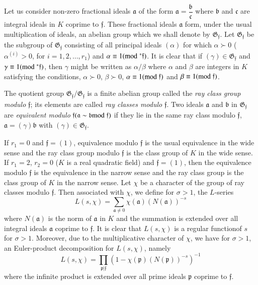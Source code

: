 Let us consider non-zero fractional ideals $\mathfrak{a}$ of the form
$\mathfrak{a}=\dfrac{\mathfrak{b}}{\mathfrak{c}}$ where $\mathfrak{b}$
and $\mathfrak{c}$ are integral ideals in $K$ coprime to
$\mathfrak{f}$. These fractional ideals $\mathfrak{a}$ form, under the
usual multiplication of ideals, an abelian group which we shall denote
by $\mathfrak{G}_{\mathfrak{f}}$. Let $\mathfrak{G}_{\mathfrak{f}}$ be
the subgroup of $\mathfrak{G}_{\mathfrak{f}}$ consisting of all
principal ideals $(\alpha)$ for which $\alpha \succ 0$ (\ie
$\alpha^{(i)}>0$, for $i=1,2,\ldots,r_{1}$) and $\alpha\equiv
1(\rm{mod} \;^{\ast}\mathfrak{f})$. It is clear that if
$(\gamma)\in\mathfrak{G}_{\mathfrak{f}}$ and $\gamma\equiv
1(\rm{mod} \;^{\ast}\mathfrak{f})$, then $\gamma$ might be written as
$\alpha/\beta$ where $\alpha$ and $\beta$ are integers in $K$
satisfying the conditions, $\alpha \succ 0$, $\beta \succ 0$, $\alpha\equiv
1(\rm{mod} \;\mathfrak{f})$ and $\beta\equiv 1(\rm{mod} \;\mathfrak{f})$. 

The quotient group
$\mathfrak{G}_{\mathfrak{f}}/\mathfrak{G}_{\mathfrak{f}}$ is a finite
abelian group called the {\em ray class group modulo} $\mathfrak{f}$;
its elements are called {\em ray classes modulo} $\mathfrak{f}$. Two
ideals $\mathfrak{a}$ and $\mathfrak{b}$ in
$\mathfrak{G}_{\mathfrak{f}}$ are {\em equivalent modulo}
$\mathfrak{f}(\mathfrak{a}\sim \mathfrak{b}\rm{mod} \;\mathfrak{f})$ if they
lie in the same ray class modulo $\mathfrak{f}$, \ie
$\mathfrak{a}=(\gamma)\mathfrak{b}$ with
$(\gamma)\in\mathfrak{G}_{\mathfrak{f}}$.

If $r_{1}=0$ and $\mathfrak{f}=(1)$, equivalence modulo $\mathfrak{f}$
is the usual equivalence in the wide sense and the ray class group
modulo $\mathfrak{f}$ is the class group of $K$ in the wide sense. If
$r_{1}=2$, $r_{2}=0$ (\ie $K$ is a real quadratic field) and
$\mathfrak{f}=(1)$, then the equivalence modulo $\mathfrak{f}$ is the
equivalence in the narrow sense and the ray class group is the class
group of $K$ in the narrow sense. Let $\chi$ be a character of the
group of ray classes modulo $\mathfrak{f}$. Then associated with
$\chi$, we define for $\sigma>1$, the $L$-series
$$
L(s,\chi)=\sum_{\mathfrak{a}\neq
  0}\chi(\mathfrak{a})(N(\mathfrak{a}))^{-s}
$$
where $N(\mathfrak{a})$ is the norm of $\mathfrak{a}$ in $K$ and the
summation is extended over all integral ideals $\mathfrak{a}$ coprime
to $\mathfrak{f}$. It is clear that $L(s,\chi)$ is a regular
function\pageoriginale of $s$ for $\sigma>1$. Moreover, due to the
multiplicative character of $\chi$, we have for $\sigma>1$, an
Euler-product decomposition for $L(s,\chi)$, namely
$$
L(s,\chi)=\prod_{\mathfrak{p}|\mathfrak{f}}(1-\chi(\mathfrak{p})(N(\mathfrak{p}))^{-s})^{-1}
$$
where the infinite product is extended over all prime ideals
$\mathfrak{p}$ coprime to $\mathfrak{f}$.

